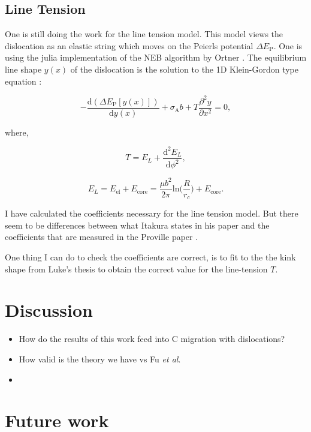 \documentclass[a4paper]{article}
\begin{document}
{\subsection{Line Tension}
\label{sec:orgbf9bc46}


One is still doing the work for the line tension model. This model views the dislocation
as an elastic string which moves on the Peierls potential \(\Delta E_{\text{P}}\). One is
using the julia implementation of the NEB algorithm by Ortner \cite{Makri2019}.
The equilibrium line shape \(y(x)\) of the dislocation is the solution to the 1D Klein-Gordon
type equation \cite{Rodney2009}:

\[ - \frac{\text{d} ( \Delta E_{\text{P}}[y(x)] )}{\text{d} y(x) } + \sigma_{\text{A}} b + T \frac{\partial^2 y}{\partial x^2} = 0,\]

where, 

\[ T = E_L + \frac{\text{d}^2 E_L}{\text{d}\phi^2},  \]


\[ E_L = E_{\text{el}} + E_{\text{core}} = \frac{\mu b^2}{2\pi} \text{ln} \big
   ( \frac{R}{r_c}\big ) + E_{\text{core}}.\]


I have calculated the coefficients necessary for the line tension model. But there seem
to be differences between what Itakura states in his paper and the coefficients that are
measured in the Proville paper \cite{Rodney2009}. 

One thing I can do to check the coefficients are correct, is to fit to the the kink
shape from Luke's thesis to obtain the correct value for the line-tension \(T\).

\section{Discussion}
\label{sec:org0170a9d}


\begin{itemize}
\item How do the results of this work feed into C migration with
dislocations?
\item How valid is the theory we have vs Fu \emph{et al}.
\item 
\end{itemize}

\section{Future work}
\label{sec:org0599ccf}

}
\end{document}
